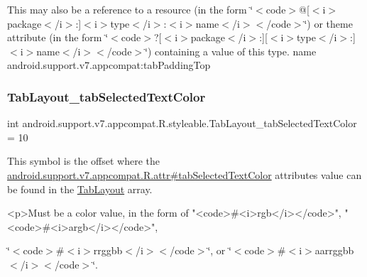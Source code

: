 This may also be a reference to a resource (in the form \char`\"{}$<$code$>$@\mbox{[}$<$i$>$package$<$/i$>$\+:\mbox{]}$<$i$>$type$<$/i$>$\+:$<$i$>$name$<$/i$>$$<$/code$>$\char`\"{}) or theme attribute (in the form \char`\"{}$<$code$>$?\mbox{[}$<$i$>$package$<$/i$>$\+:\mbox{]}\mbox{[}$<$i$>$type$<$/i$>$\+:\mbox{]}$<$i$>$name$<$/i$>$$<$/code$>$\char`\"{}) containing a value of this type.  name android.\+support.\+v7.\+appcompat\+:tab\+Padding\+Top \mbox{\label{classandroid_1_1support_1_1v7_1_1appcompat_1_1R_1_1styleable_a626aef8a758ebfe276a9f430c531fd6f}} 
\subsubsection{\texorpdfstring{Tab\+Layout\+\_\+tab\+Selected\+Text\+Color}{TabLayout\_tabSelectedTextColor}}
{\footnotesize\ttfamily int android.\+support.\+v7.\+appcompat.\+R.\+styleable.\+Tab\+Layout\+\_\+tab\+Selected\+Text\+Color = 10\hspace{0.3cm}{\ttfamily [static]}}

This symbol is the offset where the \hyperlink{classandroid_1_1support_1_1v7_1_1appcompat_1_1R_1_1attr_aea27d1caa0bd5fcc2e45b2879ed95361}{android.\+support.\+v7.\+appcompat.\+R.\+attr\#tab\+Selected\+Text\+Color} attribute\textquotesingle{}s value can be found in the \hyperlink{classandroid_1_1support_1_1v7_1_1appcompat_1_1R_1_1styleable_a3c85d0c4cebbccf5b1a16ecfe13938ca}{Tab\+Layout} array.

\begin{DoxyVerb}      <p>Must be a color value, in the form of "<code>#<i>rgb</i></code>", "<code>#<i>argb</i></code>",
\end{DoxyVerb}
 \char`\"{}$<$code$>$\#$<$i$>$rrggbb$<$/i$>$$<$/code$>$\char`\"{}, or \char`\"{}$<$code$>$\#$<$i$>$aarrggbb$<$/i$>$$<$/code$>$\char`\"{}. 

